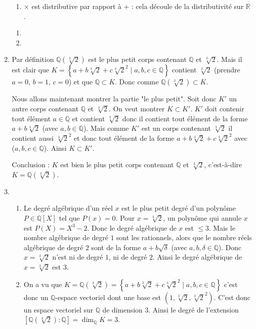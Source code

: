 \documentclass[11pt,a4paper]{article}
\newcommand{\Qq}{\mathbb{Q}} \newcommand{\Q}{\mathbb{Q}}
\newcommand{\Rr}{\mathbb{R}} \newcommand{\R}{\mathbb{R}}
\theoremstyle{definition}
\begin{document}
\begin{enumerate}
\begin{enumerate}
  \item $\times$ est distributive par rapport à $+$ : cela découle de la distributivité sur $\Rr$.
 \end{enumerate}
  
  \begin{enumerate}
    \item   
    \item    
  \end{enumerate} 
  
  \item Par définition $\Qq(\sqrt[3]{2})$ est le plus petit corps contenant $\Qq$ et $\sqrt[3]{2}$.
  Mais il est clair que $K = \left\{ a+b\sqrt[3]{2}+c\sqrt[3]{2}^2 \mid a,b,c \in \Qq \right\}$ contient $\sqrt[3]{2}$ (prendre $a=0$, $b=1$, $c=0$) et que $\Qq \subset K$.
  Donc comme $\Qq(\sqrt[3]{2}) \subset K$.
  
  Nous allons maintenant montrer la partie "le plus petit". Soit donc $K'$ un autre corps contenant
  $\Qq$ et $\sqrt[3]{2}$. On veut montrer $K \subset K'$.
  $K'$ doit contenir tout élément $a\in \Qq$ et contient $\sqrt[3]{2}$ donc il contient
  tout élément de la forme $a+b \sqrt[3]{2}$ (avec $a,b \in \Qq$).
  Mais comme $K'$ est un corps contenant $\sqrt[3]{2}$ il contient aussi $\sqrt[3]{2}^2$ et donc tout élément de la forme
  $a+b\sqrt[3]{2}+c\sqrt[3]{2}^2$ avec ($a,b,c \in \Qq$). Ainsi $K \subset K'$.
  
  Conclusion : $K$ est bien le plus petit corps contenant  $\Qq$ et $\sqrt[3]{2}$, c'est-à-dire
  $K = \Qq(\sqrt[3]{2})$.
  
  
  \item
  \begin{enumerate}
    \item Le degré algébrique d'un réel $x$ est le plus petit degré 
    d'un polynôme $P\in\Qq[X]$ tel que $P(x)=0$.
    Pour $x = \sqrt[3]{2}$, un polynôme qui annule $x$ est $P(X) = X^3-2$.
    Donc le degré algébrique de $x$ est $\le 3$. 
    Mais le nombre algébrique de degré $1$ sont les rationnels, alors que le nombre réels
    algébrique de degré $2$ sont de la forme $a+b \sqrt{\delta}$ (avec $a,b,\delta\in\Qq$).
    Donc $x = \sqrt[3]{2}$ n'est ni de degré $1$, ni de degré $2$. Ainsi le degré algébrique de
    $x = \sqrt[3]{2}$ est $3$.
    
    \item On a vu que $K=\Qq(\sqrt[3]{2}) = \left\{ a+b\sqrt[3]{2}+c\sqrt[3]{2}^2 \mid a,b,c \in \Qq \right\}$
    c'est donc un $\Qq$-espace vectoriel dont une base est $(1,\sqrt[3]{2},\sqrt[3]{2}^2)$.
    C'est donc un espace vectoriel sur $\Qq$ de dimension $3$.
    Ainsi le degré de l'extension $[\Qq(\sqrt[3]{2}):\Qq] = \dim_\Qq K = 3$.
  

\end{enumerate}
\end{enumerate}
\end{document}
